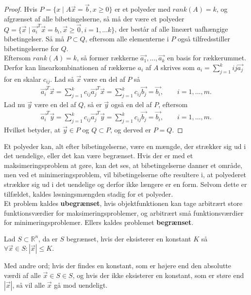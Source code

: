 \begin{proof}
Hvis $P=\{x\mid A\vec{x}=\vec{b},x\geq 0\}$ er et polyeder med $rank(A)=k$, og afgrænset af alle bibetingelserne, så må der være et polyeder $Q=\{\vec{x}\mid \vec{a_i}^T\vec{x}=b_{i}, \vec{x}\geq \vec{0}, i = 1,\dots	k\}$, der består af alle lineært uafhængige bibetingelser. Så må $P\subset Q$, eftersom alle elementerne i $P$ også tilfredsstiller bibetingelserne for $Q$.\\
Eftersom $rank(A)=k$, så former rækkerne $\vec{a_1},\dots ,\vec{a_k}$ en basis for rækkerummet. Derfor kan linearkombinationen af rækkerne $a_i$ af $A$ skrives som $a_i=\sum_{j=1}^{k}{i j}\vec{a_j}$ for en skalar $c_{i j}$. Lad så $\vec{x}$ være en del af $P$ så
\begin{align*}
\vec{a_i}^T\vec{x}=\sum_{j=1}^{k}c_{i j}\vec{a_j}^T\vec{x}=\sum_{j=1}^{k}c_{i j}\vec{b_j}=\vec{b_i}, \qquad i=1,\dots,m.
\end{align*}
Lad nu $\vec{y}$ være en del af $Q$, så er $\vec{y}$ også en del af $P$, eftersom
\begin{align*}
\vec{a_i}^T\vec{y}=\sum_{j=1}^{k}c_{i j}\vec{a_j}^T\vec{y}=\sum_{j=1}^{k}c_{i j}\vec{b_j}=\vec{b_i}, \qquad i=1,\dots,m.
\end{align*}
Hvilket betyder, at $\vec{y}\in P$ og $Q\subset P$, og derved er $P=Q$.
\end{proof}

Et polyeder kan, alt efter bibetingelserne, være en mængde, der strækker sig ud i det uendelige, eller det kan være begrænset. 
Hvis der er med et maksimeringsproblem at gøre, kan det ses, at bibetingelserne danner et område, men ved et minimeringsproblem, vil bibetingelserne ofte resultere i, at polyederet strækker sig ud i det uendelige og derfor ikke længere er en form. Selvom dette er tilfældet, kaldes løsningsmængden stadig for et polyeder. \\
Et problem kaldes \textbf{ubegrænset}, hvis objektfunktionen kan tage arbitrært store funktionsværdier for maksimeringsproblemer, og arbitrært små funktionsværdier for minimeringsproblemer. Ellers kaldes problemet \textbf{begrænset}.

\begin{defn} [Begrænset]
Lad $S \subset \mathds{R}^n$, da er $S$ begrænset, hvis der eksisterer en konstant $K$ så $\forall \vec{x} \in S: |\vec{x}| \leq K$.
\end{defn}

Med andre ord; hvis der findes en konstant, som er højere end den absolutte værdi af alle $\vec{x} \in S \in S$, og hvis der ikke eksisterer en konstant, som er støre end $|\vec{x}|$, så vil alle $\vec{x}$ gå mod uendeligt.
